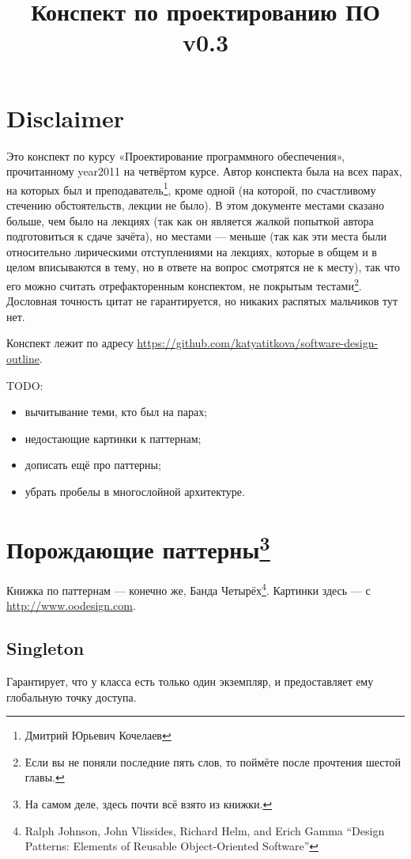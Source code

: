 \documentclass[11pt,a4paper]{article}
\title{Конспект по проектированию ПО \\ \vspace{2 mm} {\large v0.3}}
\date{}
\begin{document}
\maketitle
\tableofcontents

\section{Disclaimer}
Это конспект по курсу «Проектирование программного обеспечения», прочитанному year2011 на четвёртом курсе. Автор конспекта была на всех парах, на которых был и преподаватель\footnote{Дмитрий Юрьевич Кочелаев}, кроме одной (на которой, по счастливому стечению обстоятельств, лекции не было). В этом документе местами сказано больше, чем было на лекциях (так как он является жалкой попыткой автора подготовиться к сдаче зачёта), но местами — меньше (так как эти места были относительно лирическими отступлениями на лекциях, которые в общем и в целом вписываются в тему, но в ответе на вопрос смотрятся не к месту), так что его можно считать отрефакторенным конспектом, не покрытым тестами\footnote{Если вы не поняли последние пять слов, то поймёте после прочтения шестой главы.}. Дословная точность цитат не гарантируется, но никаких распятых мальчиков тут нет.

Конспект лежит по адресу \url{https://github.com/katyatitkova/software-design-outline}.

TODO: 
\begin{itemize}
\item вычитывание теми, кто был на парах;
\item недостающие картинки к паттернам;
\item дописать ещё про паттерны;
\item убрать пробелы в многослойной архитектуре.
\end{itemize}

\section{Порождающие паттерны\footnote{На самом деле, здесь почти всё взято из книжки.}}
Книжка по паттернам — конечно же, Банда Четырёх\footnote{Ralph Johnson, John Vlissides, Richard Helm, and Erich Gamma ``Design Patterns: Elements of Reusable Object-Oriented Software''}. Картинки здесь — с \url{http://www.oodesign.com}.
\subsection{Singleton}
Гарантирует, что у класса есть только один экземпляр, и предоставляет ему глобальную точку доступа.
\end{document}
